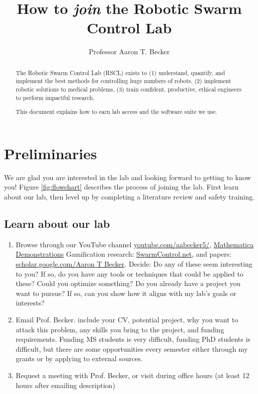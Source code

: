 \documentclass[letterpaper, 10 pt, conference]{ieeeconf}
\begin{document}
\author{Professor Aaron T. Becker}
\title{How to \emph{join} the Robotic Swarm Control Lab}
\maketitle

\begin{abstract}
The Robotic Swarm Control Lab (RSCL) exists to
 (1) understand, quantify, and implement the best methods for controlling huge numbers of robots, 
 (2)  implement robotic solutions to medical problems, 
 (3)  train confident, productive, ethical engineers to perform impactful research.

This document explains how to earn lab access and the software suite we use.
\end{abstract}

\section{Preliminaries}

We are glad you are interested in the lab and looking forward to getting to know you!  Figure \ref{fig:flowchart} describes the process of joining the lab. First learn about our lab, then level up by completing a literature review and safety training.


\subsection{Learn about our lab}

\begin{enumerate}
\item Browse through 
 our YouTube channel \href{www.youtube.com/aabecker5/}{youtube.com/aabecker5/}, 	\href{http://demonstrations.wolfram.com/author.html?author=Aaron+Becker}{Mathematica Demonstrations}
Gamification research: \href{www.SwarmControl.net}{SwarmControl.net}, 
and papers: \href{scholar.google.com/citations?user=6kGt1DEAAAAJ}{scholar.google.com/Aaron T Becker}.
Decide: Do any of these seem interesting to you? 
	If so, do you have any tools or techniques that could be applied to these?  
	Could you optimize something?
	Do you already have a project you want to pursue?  
	If so, can you show how it aligns with my lab's goals or interests?
\item	Email Prof. Becker.  include your CV, 
	 potential project, 
	why you want to attack this problem,
	any skills you bring to the project,
	and funding requirements.  Funding MS students is very difficult, funding PhD students is difficult, but there are some opportunities every semester either through my grants or by applying to external sources.
	
\item	Request a meeting with Prof. Becker, or visit during office hours (at least 12 hours after emailing description)
\end{enumerate}
\end{document}
